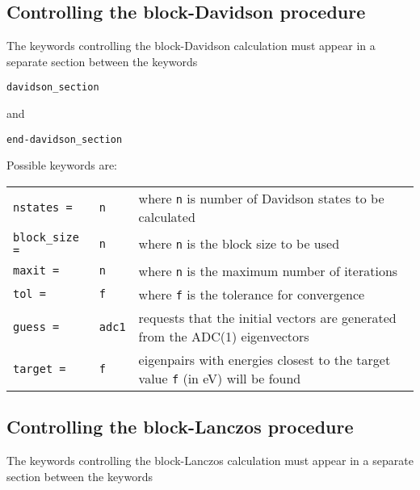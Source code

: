\documentclass[12pt]{article}
\newcommand*\code[1]{\mbox{\texttt{{#1}}}} %
\begin{document}
\subsection*{Controlling the block-Davidson procedure}
\noindent
The keywords controlling the block-Davidson calculation must appear in
a separate section between the keywords

\vspace{0.2cm}
\code{davidson\_section}

\vspace{0.2cm}
\noindent
and

\vspace{0.2cm}
\code{end-davidson\_section}

\vspace{0.2cm}
\noindent
Possible keywords are:

\begin{table}[h]
\vspace*{1.7ex}
\begin{center}
\begin{tabular}{llp{2.5in}}
\code{nstates =} & \code{n}   & where \code{n} is number of Davidson states to be calculated \\
\vspace{0.2cm}
\code{block\_size =} & \code{n} & where \code{n} is the block size to be used \\
\vspace{0.2cm}
\code{maxit =} & \code{n} & where \code{n} is the maximum number of iterations \\ 
\vspace{0.2cm}
\code{tol =} & \code{f} & where \code{f} is the tolerance for convergence \\
\vspace{0.2cm}
\code{guess =} & \code{adc1} & requests that the initial vectors are generated from the ADC(1) eigenvectors \\
\vspace{0.2cm}
\code{target =} & \code{f} & eigenpairs with energies closest to the target value \code{f} (in eV) will be found \\
\end{tabular}
\end{center}
\end{table}

\subsection*{Controlling the block-Lanczos procedure}
\noindent
The keywords controlling the block-Lanczos calculation must appear in
a separate section between the keywords
\end{document}
